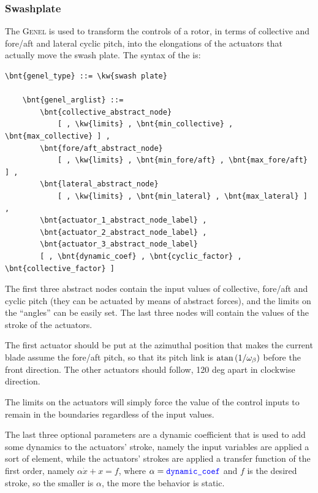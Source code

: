 \subsubsection{Swashplate}
\label{sec:EL:GENEL:SWASHPLATE}
The  \textsc{Genel} is used to transform the controls 
of a rotor, in terms of collective and fore/aft and lateral cyclic pitch, 
into the elongations of the actuators that actually move the swash plate.
The syntax of the  is:
\begin{Verbatim}[commandchars=\\\{\}]
    \bnt{genel_type} ::= \kw{swash plate}

    \bnt{genel_arglist} ::=
        \bnt{collective_abstract_node}
            [ , \kw{limits} , \bnt{min_collective} , \bnt{max_collective} ] ,
        \bnt{fore/aft_abstract_node}
            [ , \kw{limits} , \bnt{min_fore/aft} , \bnt{max_fore/aft} ] ,
        \bnt{lateral_abstract_node} 
            [ , \kw{limits} , \bnt{min_lateral} , \bnt{max_lateral} ] ,
        \bnt{actuator_1_abstract_node_label} ,
        \bnt{actuator_2_abstract_node_label} ,
        \bnt{actuator_3_abstract_node_label} 
        [ , \bnt{dynamic_coef} , \bnt{cyclic_factor} , \bnt{collective_factor} ]
\end{Verbatim}
The first three abstract nodes contain the input values 
of collective, fore/aft and cyclic pitch
(they can be actuated by means of abstract forces),
and the limits on the ``angles'' can be easily set. 
The last three nodes will contain the values of the stroke of the actuators.

The first actuator should be put at the azimuthal position 
that makes the current blade assume the fore/aft pitch,
so that its pitch link is $\mathrm{atan}\left( 1/\omega_{\beta} \right)$
before the front direction.
The other actuators should follow, 120 deg apart in clockwise direction.

The limits on the actuators will simply force the value of the control
inputs to remain in the boundaries regardless of the input values.

The last three optional parameters are a dynamic coefficient that is used to
add some dynamics to the actuators' stroke, namely the input variables are
applied a sort of   element, while the
actuators' strokes are applied a transfer function of the first order, namely
$ \alpha\dot{x}+x=f $, where $ \alpha=\textcolor{blue}{\texttt{dynamic\_coef}} $ and $ f $ is
the desired stroke, so the smaller is $ \alpha $, the more the behavior is
static.

